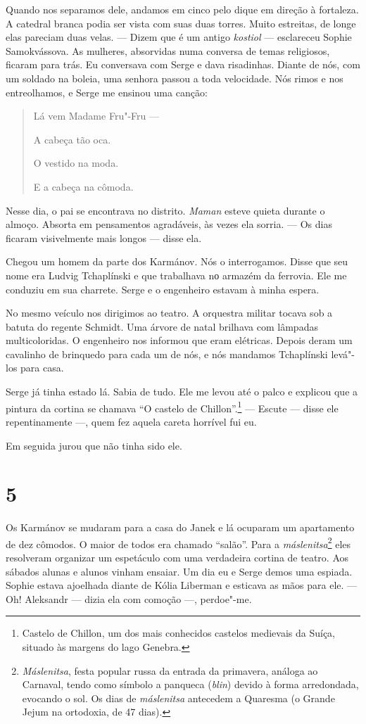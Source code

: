 Quando nos separamos dele, andamos em cinco pelo dique em direção à
fortaleza. A catedral branca podia ser vista com suas duas torres. Muito
estreitas, de longe elas pareciam duas velas. --- Dizem que é um antigo
\emph{kostiol} --- esclareceu Sophie Samokvássova. As mulheres,
absorvidas numa conversa de temas religiosos, ficaram para trás. Eu
conversava com Serge e dava risadinhas. Diante de nós, com um soldado na
boleia, uma senhora passou a toda velocidade. Nós rimos e nos
entreolhamos, e Serge me ensinou uma canção:

\begin{quotation}
Lá vem Madame Fru"-Fru ---

A cabeça tão oca.

O vestido na moda.

E a cabeça na cômoda.
\end{quotation}

Nesse dia, o pai se encontrava no distrito. \emph{Maman} esteve quieta
durante o almoço. Absorta em pensamentos agradáveis, às vezes ela
sorria. --- Os dias ficaram visivelmente mais longos --- disse ela.

Chegou um homem da parte dos Karmánov. Nós o interrogamos. Disse que seu
nome era Ludvig Tchaplínski e que trabalhava nо armazém da ferrovia. Ele
me conduziu em sua charrete. Serge e o engenheiro estavam à minha
espera.

No mesmo veículo nos dirigimos ao teatro. A orquestra militar tocava sob
a batuta do regente Schmidt. Uma árvore de natal brilhava com lâmpadas
multicoloridas. O engenheiro nos informou que eram elétricas. Depois
deram um cavalinho de brinquedo para cada um de nós, e nós mandamos
Tchaplínski levá"-los para casa.

Serge já tinha estado lá. Sabia de tudo. Ele me levou até o palco e
explicou que a pintura da cortina se chamava ``O castelo de
Chillon''.\footnote{Castelo de Chillon, um dos mais conhecidos castelos
  medievais da Suíça, situado às margens do lago Genebra.} --- Escute
--- disse ele repentinamente ---, quem fez aquela careta horrível fui
eu.

Em seguida jurou que não tinha sido ele.

\section{5}

Os Karmánov se mudaram para a casa do Janek e lá ocuparam um apartamento
de dez cômodos. O maior de todos era chamado ``salão''. Para a
\emph{máslenitsa}\footnote{\emph{Máslenitsa}, festa popular russa da
  entrada da primavera, análoga ao Carnaval, tendo como símbolo a
  panqueca (\emph{blin}) devido à forma arredondada, evocando o sol. Os
  dias de \emph{máslenitsa} antecedem a Quaresma (o Grande Jejum na
  ortodoxia, de 47 dias).} eles resolveram organizar um espetáculo com
uma verdadeira cortina de teatro. Aos sábados alunas e alunos vinham
ensaiar. Um dia eu e Serge demos uma espiada. Sophie estava ajoelhada
diante de Kólia Liberman e esticava as mãos para ele. --- Oh! Aleksandr
--- dizia ela com comoção ---, perdoe"-me.

